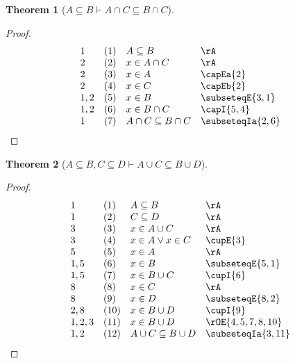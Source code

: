 \documentclass{book}
\theoremstyle{plain}
\newtheorem{theorem}{Theorem}
\theoremstyle{remark}
\theoremstyle{definition}
\begin{document}
\label{ASubseteqBImpAcaCSubseteqBcaC}
\begin{theorem}[\(A \subseteq B \vdash A \cap C \subseteq B \cap C\)]
\end{theorem}
\begin{proof}
	\[
	\begin{array}{llll}
		1 & (1) & A \subseteq B & \rA \\
		2 & (2) & x \in A \cap C & \rA \\
		2 & (3) & x \in A & \capEa{2} \\
		2 & (4) & x \in C & \capEb{2} \\
		1,2 & (5) & x \in B & \subseteqE{3,1} \\		
		1,2 & (6) & x \in B\cap C & \capI{5,4} \\	
		1 & (7) & A\cap C\subseteq B\cap C & \subseteqIa{2,6} \\
	\end{array}
	\]
\end{proof}

\label{ASubseteqBwCSubseteqDImpAcuCSubseteqBcuD}
\begin{theorem}[\(A \subseteq B, C \subseteq D \vdash A \cup C \subseteq B \cup D\)]
\end{theorem}
\begin{proof}
	\[
	\begin{array}{llll}
		1 & (1) & A \subseteq B & \rA \\
		1 & (2) & C \subseteq D & \rA \\
		3 & (3) & x \in A \cup C & \rA \\
		3 & (4) & x \in A \lor x \in C & \cupE{3}\\		
		5 & (5) & x \in A & \rA \\
		1,5 & (6) & x \in B & \subseteqE{5,1} \\
		1,5 & (7) & x \in B\cup C & \cupI{6} \\	
		8 & (8) & x \in C & \rA \\			
		8 & (9) & x \in D & \subseteqE{8,2} \\	
		2,8 & (10) & x \in B\cup D & \cupI{9} \\	
		1,2,3 & (11) & x \in B\cup D & \rOE{4,5,7,8,10} \\	
		1,2 & (12) & A \cup C\subseteq B\cup D & \subseteqIa{3,11} \\			
	\end{array}
	\]
\end{proof}
\end{document}
